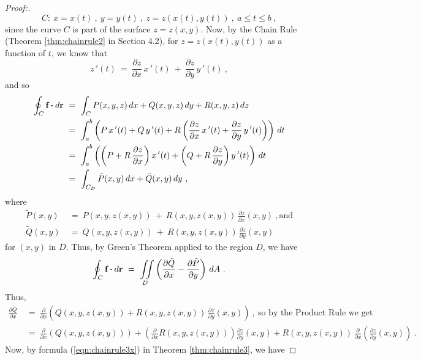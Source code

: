 \begin{proofbar}
\begin{proof}[Proof:]
\begin{displaymath}
  C:~ x=x(t)~,~ y=y(t)~,~ z=z(x(t),y(t))~,~a \le t \le b ~,
 \end{displaymath}
 since the curve $C$ is part of the surface $z=z(x,y)$. Now, by the Chain Rule (Theorem \ref{thm:chainrule2} in
 Section 4.2), for $z=z(x(t),y(t))$ as a function of $t$, we know that
 \begin{displaymath}
  z\,'(t) ~=~ \frac{\partial z}{\partial x}\,x\,'(t) ~+~ \frac{\partial z}{\partial y}\,y\,'(t) ~,
 \end{displaymath}
 and so
 \begin{align*}
  \oint_{C} \textbf{f} \bm{\cdot} d\textbf{r} ~&=~ \int_C P(x,y,z)\,dx + Q(x,y,z)\,dy + R(x,y,z)\,dz\\
   &=~ \int_a^b \left( P\,x\,'(t) + Q\,y\,'(t) +
    R\left( \frac{\partial z}{\partial x}\,x\,'(t) + \frac{\partial z}{\partial y}\,y\,'(t)
    \right) \right)\,dt\\
   &=~ \int_a^b \left( \left( P+R\,\frac{\partial z}{\partial x} \right) x\,'(t) +
    \left( Q+R\,\frac{\partial z}{\partial y} \right) y\,'(t) \right)\,dt\\
   &=~ \int_{C_D} \tilde{P}(x,y)\,dx + \tilde{Q}(x,y)\,dy ~,
 \end{align*}
 where
 \begin{align*}
  \tilde{P}(x,y) ~&=~ P(x,y,z(x,y)) ~+~ R(x,y,z(x,y))\,\frac{\partial z}{\partial x}(x,y)~,\text{and}\\
  \tilde{Q}(x,y) ~&=~ Q(x,y,z(x,y)) ~+~ R(x,y,z(x,y))\,\frac{\partial z}{\partial y}(x,y)
 \end{align*}
 for $(x,y)$ in $D$. Thus, by Green's Theorem applied to the region $D$, we have
 \begin{equation}\label{eqn:stokesproof}
  \oint_{C} \textbf{f} \bm{\cdot} d\textbf{r} ~=~ \iint\limits_{D} \left( \frac{\partial \tilde{Q}}{\partial x} -
   \frac{\partial \tilde{P}}{\partial y} \right)\,dA ~.
 \end{equation}
 Thus,
 \begin{align*}
  \frac{\partial \tilde{Q}}{\partial x} ~&=~ \frac{\partial}{\partial x} \left( Q(x,y,z(x,y)) +
   R(x,y,z(x,y))\,\frac{\partial z}{\partial y}(x,y) \right) ~,~\text{so by the Product Rule we get}\\
   &=~ \frac{\partial}{\partial x} \left( Q(x,y,z(x,y)) \right) + \left( \frac{\partial}{\partial x} R(x,y,z(x,y))
   \right) \frac{\partial z}{\partial y}(x,y) + R(x,y,z(x,y))\,\frac{\partial}{\partial x} \left(
   \frac{\partial z}{\partial y}(x,y) \right) ~.
 \end{align*}
 Now, by formula (\ref{eqn:chainrule3x}) in Theorem \ref{thm:chainrule3}, we have

\end{proof}
\end{proofbar}
